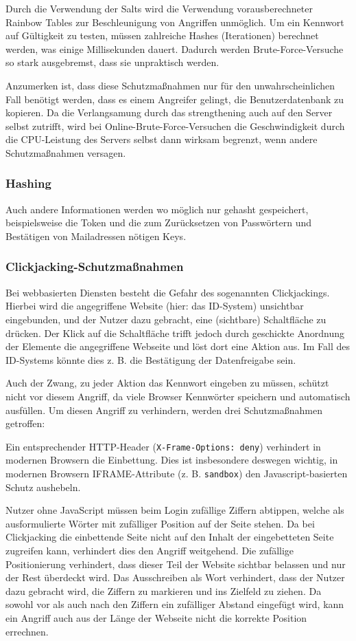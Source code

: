 Durch die Verwendung der Salts wird die Verwendung vorausberechneter Rainbow Tables zur Beschleunigung von Angriffen unmöglich.
Um ein Kennwort auf Gültigkeit zu testen, müssen zahlreiche Hashes (Iterationen) berechnet werden, was einige Millisekunden dauert.
Dadurch werden Brute-Force-Versuche so stark ausgebremst, dass sie unpraktisch werden.

Anzumerken ist, dass diese Schutzmaßnahmen nur für den unwahrscheinlichen Fall benötigt werden, dass es einem Angreifer gelingt, die Benutzerdatenbank zu kopieren.
Da die Verlangsamung durch das strengthening auch auf den Server selbst zutrifft,
wird bei Online-Brute-Force-Versuchen die Geschwindigkeit durch die CPU-Leistung des Servers selbst dann wirksam begrenzt,
wenn andere Schutzmaßnahmen versagen.

\subsubsection{Hashing}
Auch andere Informationen werden wo möglich nur gehasht gespeichert,
beispielsweise die Token und die zum Zurücksetzen von Passwörtern und Bestätigen von Mailadressen nötigen Keys.

\subsubsection{Clickjacking-Schutzmaßnahmen}
Bei webbasierten Diensten besteht die Gefahr des sogenannten Clickjackings.
Hierbei wird die angegriffene Website (hier: das ID-System) unsichtbar eingebunden, und der Nutzer dazu gebracht, eine (sichtbare) Schaltfläche zu drücken.
Der Klick auf die Schaltfläche trifft jedoch durch geschickte Anordnung der Elemente die angegriffene Webseite und löst dort eine Aktion aus.
Im Fall des ID-Systems könnte dies z. B. die Bestätigung der Datenfreigabe sein.

Auch der Zwang, zu jeder Aktion das Kennwort eingeben zu müssen, schützt nicht vor diesem Angriff, da viele Browser Kennwörter speichern und automatisch ausfüllen.
Um diesen Angriff zu verhindern, werden drei Schutzmaßnahmen getroffen:

Ein entsprechender HTTP-Header (\texttt{X-Frame-Options: deny}) verhindert in modernen Browsern die Einbettung.
Dies ist insbesondere deswegen wichtig, in modernen Browsern IFRAME-Attribute (z. B. \texttt{sandbox}) den Javascript-basierten Schutz aushebeln.

Nutzer ohne JavaScript müssen beim Login zufällige Ziffern abtippen, welche als ausformulierte Wörter mit zufälliger Position auf der Seite stehen.
Da bei Clickjacking die einbettende Seite nicht auf den Inhalt der eingebetteten Seite zugreifen kann, verhindert dies den Angriff weitgehend.
Die zufällige Positionierung verhindert, dass dieser Teil der Website sichtbar belassen und nur der Rest überdeckt wird.
Das Ausschreiben als Wort verhindert, dass der Nutzer dazu gebracht wird, die Ziffern zu markieren und ins Zielfeld zu ziehen.
Da sowohl vor als auch nach den Ziffern ein zufälliger Abstand eingefügt wird, kann ein Angriff auch aus der Länge der Webseite nicht die korrekte Position errechnen.

